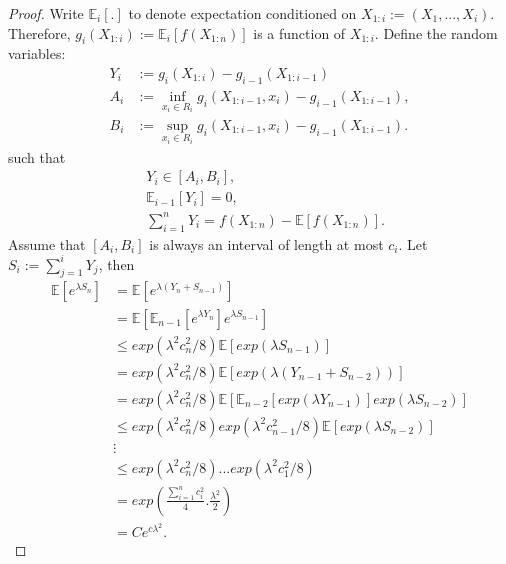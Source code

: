 \documentclass{article}
\begin{document}
\begin{proof}
    Write $\mathbb{E}_i [.]$ to denote expectation conditioned on $X_{1:i} := (X_1, ..., X_i)$. Therefore, $g_i (X_{1:i}) := \mathbb{E}_i[f(X_{1:n})]$ is a function of $X_{1:i}$. Define the random variables:
    \begin{align*}
        Y_i &:= g_i(X_{1:i}) - g_{i-1}(X_{1:i-1})\\
        A_i &:= \inf\limits_{x_i \in R_i} g_i(X_{1:i-1}, x_i) - g_{i-1}(X_{1:i-1}), \\
        B_i &:= \sup\limits_{x_i \in R_i} g_i (X_{1:i-1}, x_i) - g_{i-1}(X_{1:i-1}).
    \end{align*}
    such that
    \begin{align*}
        &Y_i \in [A_i, B_i],\\
        &\mathbb{E}_{i-1} [Y_i] = 0,\\
        &\sum\limits_{i=1}^{n} Y_i = f(X_{1:n}) - \mathbb{E}[f(X_{1:n})].
    \end{align*}
    Assume that $[A_i, B_i]$ is always an interval of length at most $c_i$. Let $S_i := \sum\limits_{j=1}^i Y_j$, then
    \begin{align*}
        \mathbb{E}[e^{\lambda S_n}] &= \mathbb{E}[e^{\lambda(Y_n + S_{n-1})}] \\
                                    &= \mathbb{E}\left[\mathbb{E}_{n-1}\left[e^{\lambda Y_n}\right]e^{\lambda S_{n-1}}\right] \\
                                    &\leq exp(\lambda^2 c_n^2/8) \mathbb{E}[exp(\lambda S_{n-1})] \\
                                    &= exp(\lambda^2 c_n^2/8)\mathbb{E}[exp(\lambda(Y_{n-1} + S_{n-2}))]\\
                                    &= exp(\lambda^2 c_n^2/8)\mathbb{E}[\mathbb{E}_{n-2}[exp(\lambda Y_{n-1})]exp(\lambda S_{n-2})]\\
                                    &\leq exp(\lambda^2 c_n^2/8)exp(\lambda^2 c_{n-1}^2/8)\mathbb{E}[exp(\lambda S_{n-2})]\\
                                    &\vdots \\
                                    &\leq exp(\lambda^2 c_n^2/8)...exp(\lambda^2 c_1^2/8) \\
                                    &= exp\left(\frac{\sum_{i=1}^n c_i^2}{4} .\frac{\lambda^2}{2}\right)\\
                                    &= Ce^{c\lambda^2}.
    \end{align*}

\end{proof}
\end{document}
